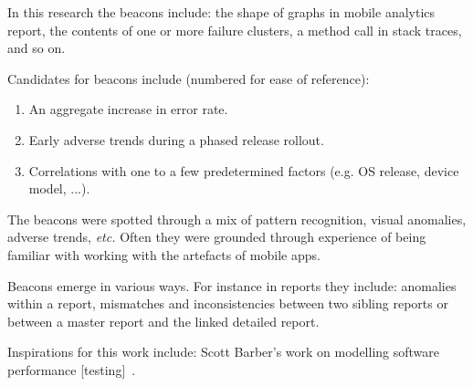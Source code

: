 
In this research the beacons include: the shape of graphs in mobile analytics report, the contents of one or more failure clusters, a method call in stack traces, and so on.

Candidates for beacons include (numbered for ease of reference):
\begin{enumerate}
    \item An aggregate increase in error rate.
    \item Early adverse trends during a phased release rollout.
    \item Correlations with one to a few predetermined factors (e.g. OS release, device model, ...).
\end{enumerate}


The beacons were spotted through a mix of pattern recognition, visual anomalies, adverse trends, \emph{etc.} Often they were grounded through experience of being familiar with working with the artefacts of mobile apps.

Beacons emerge in various ways. For instance in reports they include: anomalies within a report, mismatches and inconsistencies between two sibling reports or between a master report and the linked detailed report.

Inspirations for this work include: Scott Barber's work on modelling software performance [testing]~.